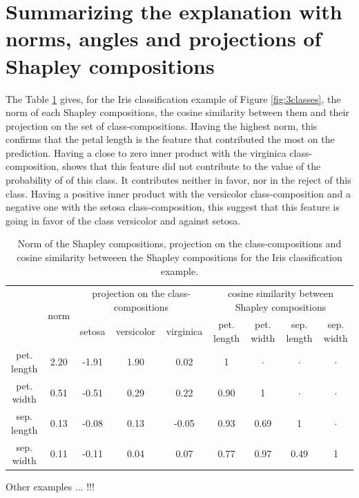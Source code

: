 \documentclass{article}
\theoremstyle{plain}
\theoremstyle{definition}
\theoremstyle{remark}
\begin{document}
\newpage
\section{Summarizing the explanation with norms, angles and projections of Shapley compositions}
\label{app:summarize}

The Table \ref{tab:normiris} gives, for the Iris classification example of Figure \ref{fig:3classes}, the norm of each Shapley compositions, the cosine similarity between them and their projection on the set of class-compositions. Having the highest norm, this confirms that the petal length is the feature that contributed the most on the prediction. Having a close to zero inner product with the virginica class-composition, shows that this feature did not contribute to the value of the probability of of this class. It contributes neither in favor, nor in the reject of this class. Having a positive inner product with the versicolor class-composition and a negative one with the setosa class-composition, this suggest that this feature is going in favor of the class versicolor and against setosa.
\begin{table}
  \centering
  \caption{Norm of the Shapley compositions, projection on the class-compositions and cosine similarity betweeen the Shapley compositions for the Iris classification example.}
  \begin{tabular}{c|c|ccc|cccc|}
    \cline{2-9}
    & \multirow{2}{*}{norm} & \multicolumn{3}{c|}{projection on the class-compositions} & \multicolumn{4}{c|}{cosine similarity between Shapley compositions} \\
    \cline{3-9}
     & & \small setosa & \small versicolor & \small virginica & \small pet. length & \small pet. width & \small sep. length & \small sep. width \\
    \hline
    \small pet. length & 2.20  & -1.91 & 1.90 & 0.02 & 1 &$\cdot$ &$\cdot$ &$\cdot$ \\
    \small pet. width & 0.51 & -0.51 & 0.29 & 0.22 & 0.90 & 1 &$\cdot$ &$\cdot$ \\
    \small sep. length & 0.13 & -0.08 & 0.13 & -0.05 & 0.93 & 0.69 & 1 &$\cdot$ \\
    \small sep. width & 0.11 & -0.11 & 0.04 & 0.07 & 0.77 & 0.97 & 0.49 &1 \\
    \hline
  \end{tabular}
  \label{tab:normiris}
\end{table}

Other examples ... !!!
\end{document}
